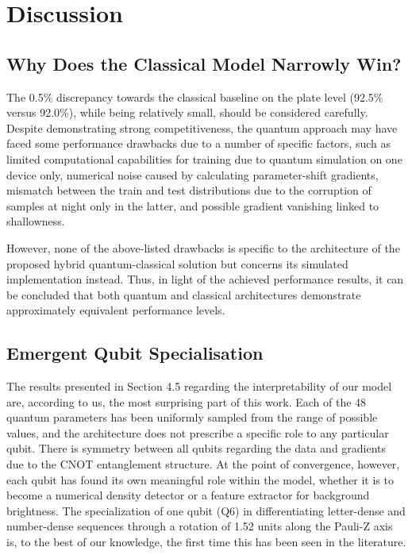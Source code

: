 \documentclass{ieeeaccess}
\begin{document}
\section{Discussion}

\subsection{Why Does the Classical Model Narrowly Win?}
The 0.5\% discrepancy towards the classical baseline on the plate level (92.5\% versus 92.0\%), while being relatively small, should be considered carefully. Despite demonstrating strong competitiveness, the quantum approach may have faced some performance drawbacks due to a number of specific factors, such as limited computational capabilities for training due to quantum simulation on one device only, numerical noise caused by calculating parameter-shift gradients, mismatch between the train and test distributions due to the corruption of samples at night only in the latter, and possible gradient vanishing linked to shallowness. 

However, none of the above-listed drawbacks is specific to the architecture of the proposed hybrid quantum-classical solution but concerns its simulated implementation instead. Thus, in light of the achieved performance results, it can be concluded that both quantum and classical architectures demonstrate approximately equivalent performance levels.

\subsection{Emergent Qubit Specialisation}
The results presented in Section 4.5 regarding the interpretability of our model are, according to us, the most surprising part of this work. Each of the 48 quantum parameters has been uniformly sampled from the range of possible values, and the architecture does not prescribe a specific role to any particular qubit. There is symmetry between all qubits regarding the data and gradients due to the CNOT entanglement structure. At the point of convergence, however, each qubit has found its own meaningful role within the model, whether it is to become a numerical density detector or a feature extractor for background brightness. The specialization of one qubit (Q6) in differentiating letter-dense and number-dense sequences through a rotation of 1.52 units along the Pauli-Z axis is, to the best of our knowledge, the first time this has been seen in the literature.
\end{document}
